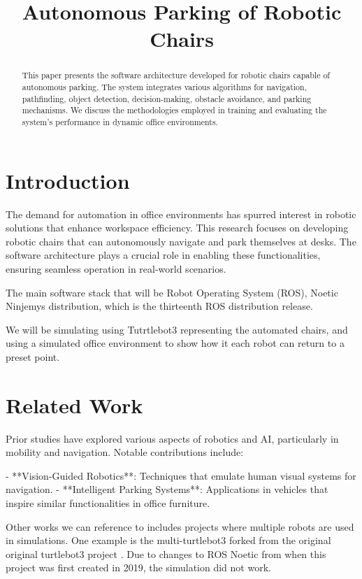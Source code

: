 \documentclass[a4paper,twocolumn]{article}
\title{Autonomous Parking of Robotic Chairs}
\date{}
\begin{document}
\maketitle

\begin{abstract}
This paper presents the software architecture developed for robotic chairs capable of autonomous parking. The system integrates various algorithms for navigation, pathfinding, object detection, decision-making, obstacle avoidance, and parking mechanisms. We discuss the methodologies employed in training and evaluating the system's performance in dynamic office environments.
\end{abstract}

\section{Introduction}
The demand for automation in office environments has spurred interest in robotic solutions that enhance workspace efficiency. This research focuses on developing robotic chairs that can autonomously navigate and park themselves at desks. The software architecture plays a crucial role in enabling these functionalities, ensuring seamless operation in real-world scenarios.

The main software stack that will be Robot Operating System (ROS), Noetic Ninjemys distribution, which is the thirteenth ROS distribution release. 

We will be simulating using Tutrtlebot3 representing the automated chairs, and using a simulated office environment to show how it each robot can return to a preset point. 

\section{Related Work}
Prior studies have explored various aspects of robotics and AI, particularly in mobility and navigation. Notable contributions include:

- **Vision-Guided Robotics**: Techniques that emulate human visual systems for navigation.
- **Intelligent Parking Systems**: Applications in vehicles that inspire similar functionalities in office furniture.

Other works we can reference to includes projects where multiple robots are used in simulations. One example is the multi-turtlebot3 forked from the original original turtlebot3 project \cite{multiturtle}. Due to changes to ROS Noetic from when this project was first created in 2019, the simulation did not work. 
\end{document}
